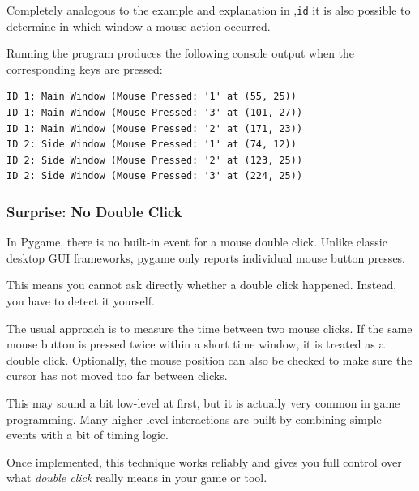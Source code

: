 Completely analogous to the example and explanation in ,\texttt{id} it is also possible to determine in which window a mouse action occurred.


Running the program produces the following console output when the corresponding keys are pressed:

\lstset{firstnumber=1}
\begin{lstlisting}
ID 1: Main Window (Mouse Pressed: '1' at (55, 25))
ID 1: Main Window (Mouse Pressed: '3' at (101, 27))
ID 1: Main Window (Mouse Pressed: '2' at (171, 23))
ID 2: Side Window (Mouse Pressed: '1' at (74, 12))
ID 2: Side Window (Mouse Pressed: '2' at (123, 25))
ID 2: Side Window (Mouse Pressed: '3' at (224, 25))
\end{lstlisting}

\subsubsection{Surprise: No Double Click}

\begin{warningbox}
	In Pygame, there is no built-in event for a mouse double click. Unlike classic desktop GUI frameworks, pygame only reports individual mouse button presses.
\end{warningbox}

This means you cannot ask directly whether a double click happened. Instead, you have to detect it yourself.

The usual approach is to measure the time between two mouse clicks. If the same mouse button is pressed twice within a short time window, it is treated as a double click. Optionally, the mouse position can also be checked to make sure the cursor has not moved too far between clicks.

This may sound a bit low-level at first, but it is actually very common in game programming. Many higher-level interactions are built by combining simple events with a bit of timing logic.

Once implemented, this technique works reliably and gives you full control over what \emph{double click} really means in your game or tool.

